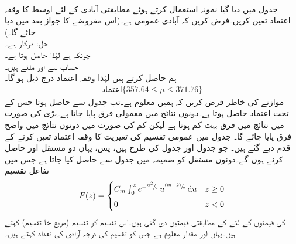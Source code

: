 \quad {}\\
جدول  میں دیا گیا نمونہ استعمال کرتے ہوئے  مطابقتی آبادی کے لئے اوسط  کا  وقفہ اعتماد تعین کریں۔فرض کریں کہ آبادی عمومی ہے۔(اس مفروضے کا جواز بعد میں دیا جائے گا۔)\\
حل:\quad
{}\quad
{} درکار ہے۔\\
\quad
چونکہ  ہے لہٰذا  حاصل ہوتا ہے۔\\
\quad
حساب سے  اور  ملتے ہیں۔\\
 \quad
ہم  حاصل کرتے ہیں لہٰذا وقفہ اعتماد درج ذیل ہو گا۔
\begin{align*}
\text{اعتماد}\{357.64\le \mu\le 371.76\}
\end{align*}
موازنے کی خاطر فرض کریں کہ ہمیں  معلوم ہے۔تب جدول  سے
  حاصل ہوتا جس کے تحت   اعتماد حاصل ہوتا ہے۔دونوں نتائج میں معمولی فرق پایا جاتا ہے۔بڑی  کی صورت میں نتائج میں فرق بہت کم ہوتا ہے لیکن کم  کی صورت میں دونوں نتائج میں واضح فرق پایا جائے گا۔
جدول  میں عمومی تقسیم کی تغیریت کا وقفہ اعتماد تعین کرنے کے قدم دیے گئے ہیں۔ جو جدول  اور جدول  کی طرح ہیں، پس، یہاں دو مستقل  اور  حاصل کرنے ہوں گے۔دونوں مستقل  کو ضمیمہ  میں جدول  سے حاصل کیا جاتا ہے جس میں تفاعل تقسیم
\begin{align*}
F(z)=
\begin{cases}
C_m\int_0^z e^{-^{u^2}\!/\!_2}\,u^{^{(m-2)}\!/\!_2}\dif u& z\ge 0\\[1ex]
0&z<0
\end{cases}
\end{align*}
کی قیمتوں کے لئے  کے مطابقتی قیمتیں دی گئی ہیں۔اس تقسیم کو تقسیم (مربع خا تقسیم) کہتے ہیں۔یہاں
  اور  مقدار معلوم ہے جس کو تقسیم کی درجہ آزادی کی تعداد کہتے ہیں۔

